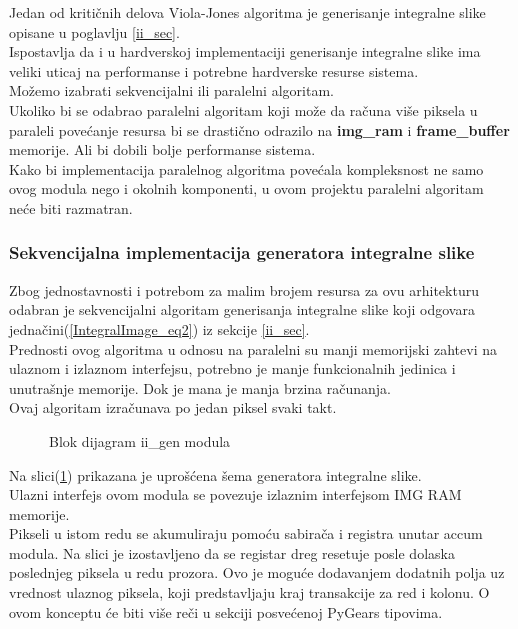Jedan od kritičnih delova Viola-Jones algoritma je generisanje integralne slike
opisane u poglavlju \ref{ii_sec}. \\
Ispostavlja da i u hardverskoj implementaciji generisanje
integralne slike ima veliki uticaj na performanse i potrebne hardverske resurse sistema. \\

Možemo izabrati sekvencijalni ili paralelni algoritam. \\
Ukoliko bi se odabrao paralelni algoritam koji može da računa više piksela u paraleli
povećanje resursa bi se drastično odrazilo na \textbf{img\_ram} i \textbf{frame\_buffer} memorije.
Ali bi dobili bolje performanse sistema. \\
Kako bi implementacija paralelnog algoritma povećala kompleksnost ne samo ovog
modula nego i okolnih komponenti, u ovom projektu paralelni algoritam neće biti razmatran.

\subsubsection{Sekvencijalna implementacija generatora integralne slike}\label{ii_seq_alg_sec}

Zbog jednostavnosti i potrebom za malim brojem resursa za ovu arhitekturu
odabran je sekvencijalni algoritam generisanja integralne slike koji odgovara
jednačini(\ref{IntegralImage_eq2}) iz sekcije \ref{ii_sec}.\\

Prednosti ovog algoritma u odnosu na paralelni su manji memorijski zahtevi na
ulaznom i izlaznom interfejsu, potrebno je manje funkcionalnih jedinica i
unutrašnje memorije.
Dok je  mana je manja brzina računanja. \\
Ovaj algoritam izračunava po jedan piksel svaki takt. \\

\begin{figure}[H]
  \centering
  \resizebox{\textwidth}{!}{%
    
    }
\caption{Blok dijagram ii\_gen modula}
\label{ii_gen}
\end{figure}

Na slici(\ref{ii_gen}) prikazana je uprošćena šema generatora integralne slike.
\\

Ulazni interfejs ovom modula se povezuje izlaznim interfejsom IMG RAM memorije.
\\

Pikseli u istom redu se akumuliraju pomoću sabirača i registra unutar accum modula.
Na slici je izostavljeno da se registar dreg resetuje posle dolaska poslednjeg
piksela u redu prozora.
Ovo je moguće dodavanjem dodatnih polja uz vrednost ulaznog piksela, koji
predstavljaju kraj transakcije za red i kolonu.
O ovom konceptu će biti više reči u sekciji posvećenoj PyGears tipovima. \\

